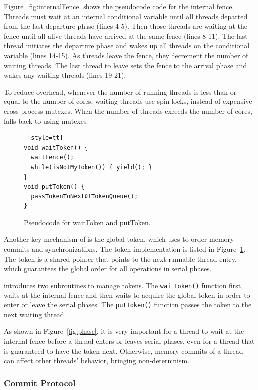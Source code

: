 Figure~\ref{fig:internalFence} shows the pseudocode code for the internal fence. Threads must wait at an internal conditional variable until all threads departed from the last departure phase (lines 4-5). Then those threads are waiting at the fence until all alive threads have arrived at the same fence (lines 8-11). The last thread initiates the departure phase and wakes up all threads on the conditional variable (lines 14-15). As threads leave the fence, they decrement the number of waiting threads.  The last thread to leave sets the fence to the arrival phase and wakes any waiting threads (lines 19-21).

To reduce overhead, whenever the number of running threads is less than or equal to the number of cores, waiting threads use spin locks, instead of expensive cross-process \pthreads{} mutexes. When the number of threads exceeds the number of cores, \dthreads{} falls back to using \pthreads{} mutexes.

\begin{figure}
\begin{lstlisting} [style=tt]
void waitToken() {
  waitFence();
  while(isNotMyToken()) { yield(); }
}
void putToken() {
  passTokenToNextOfTokenQueue();
}
\end{lstlisting}
\caption{Pseudocode for waitToken and putToken. 
\label{fig:token}}
\end{figure}

Another key mechanism of \dthreads{} is the global token, which \dthreads{} uses to order memory commits and synchronizations. The token implementation is listed in Figure~\ref{fig:token}. The token is a shared pointer that points to the next runnable thread entry, which guarantees the global order for all operations in serial phases.  

\dthreads{} introduces two subroutines to manage tokens.  The \texttt{waitToken()} function first waits at the internal fence and then waits to acquire the global token in order to enter or leave the serial phases. The \texttt{putToken()} function passes the token to the next waiting thread. 

As shown in Figure~\ref{fig:phase}, it is very important for a thread to wait at the internal fence before a thread enters  or leaves serial phases, even for a thread that is guaranteed to have the token next. Otherwise, memory commits of a thread can affect other threads' behavior, bringing non-determnism. 

\subsubsection{Commit Protocol}

